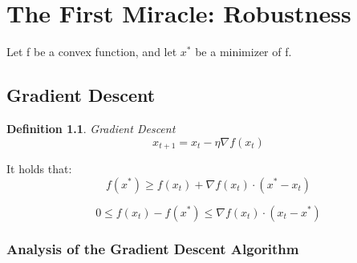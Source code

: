 \documentclass[11pt]{book} %
\newtheorem{definition}{Definition}[section]
\begin{document}



\chapter{The First Miracle: Robustness}

Let f be a convex function, and let $x^*$ be a minimizer of f. 

\section{Gradient Descent}
\begin{definition}{Gradient Descent} \\
    \begin{equation}
       x_{t+1} = x_t - \eta \nabla f(x_t) 
    \end{equation}
\end{definition}

It holds that:
\begin{equation}
    f(x^*) \geq f(x_t) + \nabla f(x_t) \cdot (x^* - x_t)
\end{equation}

\begin{equation}
    0 \leq f(x_t) - f(x^*) \leq \nabla f(x_t) \cdot (x_t - x^*) 
\end{equation}

\subsection{Analysis of the Gradient Descent Algorithm}
\end{document}
